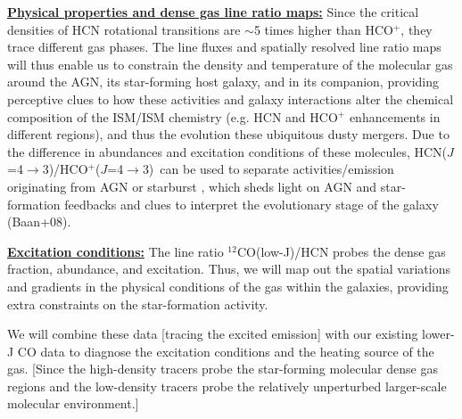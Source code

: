 \documentclass[12pt,a4paper]{article}  %
\newcommand{\comol}{$^{12}$CO\xspace}
\newcommand{\rarr}{$\rightarrow$}
\newcommand{\dhcn}{\mbox{HCN($J$=4\rarr3)}\xspace}
\newcommand{\hcop}{HCO$^+$\xspace}
\newcommand{\dhcop}{\mbox{HCO$^+$($J$=4\rarr3) }}
\begin{document}
\underline{\bf Physical properties and dense gas line ratio maps:}
Since the critical densities of HCN rotational transitions are $\sim$5 times
higher than \hcop, they trace different gas phases.
The line fluxes and spatially resolved line ratio maps will thus enable us 
 to constrain the density and temperature of the molecular gas around 
 the AGN, its star-forming host galaxy, and in its companion, providing perceptive clues to how these
activities and galaxy interactions alter the chemical composition of the ISM/ISM chemistry (e.g. HCN 
and \hcop enhancements in different regions), and thus the evolution these ubiquitous dusty mergers.
Due to the difference in abundances and excitation conditions of these molecules,
\dhcn/\dhcop can be used to separate activities/emission originating from AGN or starburst
\citep{Imanishi10, Izumi13a}, %
which sheds light on AGN and star-formation feedbacks and clues to interpret 
the evolutionary stage of the galaxy (Baan+08).


\underline{\bf Excitation conditions:}
The line ratio \comol(low-J)/HCN probes the dense gas fraction, abundance, and excitation. Thus, we will 
map out the spatial variations and gradients in the physical conditions of
the gas within the galaxies, providing extra constraints on the star-formation activity.

We will combine these data [tracing the excited emission] with our existing lower-J CO 
data to diagnose the excitation conditions and the heating source of the gas. [Since the high-density tracers probe 
the star-forming molecular dense gas regions and
the low-density tracers probe the relatively unperturbed larger-scale molecular
environment.]

\end{document}
